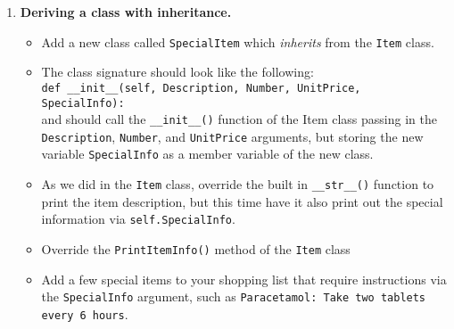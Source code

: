 \documentclass[11pt]{report}
\begin{document}
\begin{enumerate}
	\item {\bf Deriving a class with inheritance.}
	\begin{itemize}
		\item Add a new class called {\tt SpecialItem} %
		which \emph{inherits} from the {\tt Item} class.
		\item The class signature should look like the following:\\
		\verb|def __init__(self, Description, Number, UnitPrice, SpecialInfo):|\\
		and should call the \verb|__init__()| function of the Item class passing in the {\tt Description}, {\tt Number}, and {\tt UnitPrice} arguments, but storing the new variable {\tt SpecialInfo} as a member variable of the new class.
		\item As we did in the {\tt Item} class, override the built in \verb|__str__()| function to print the item description, but this time have it also print out the special information via {\tt self.SpecialInfo}.
		\item Override the {\tt PrintItemInfo()} method of the {\tt Item} class
		\item Add a few special items to your shopping list that require instructions via the {\tt SpecialInfo} argument, such as {\tt Paracetamol: Take two tablets every 6 hours}.
	\end{itemize}
\end{enumerate}
\end{document}
